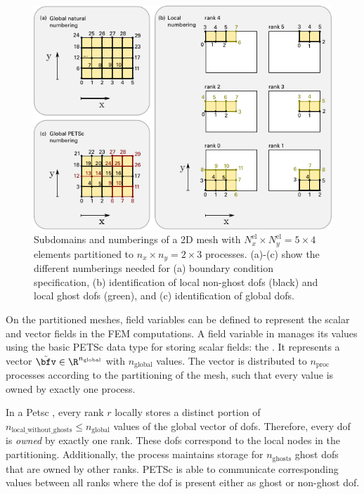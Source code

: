 \begin{figure}%
  \centering%
  \includegraphics[width=\textwidth]{images/implementation/dof_numbering.pdf}%
  \caption{Subdomains and numberings of a 2D mesh with $N^\text{el}_x \times N^\text{el}_y=5\times 4$ elements partitioned to $n_x\times n_y = 2 \times 3$ processes. (a)-(c) show the different numberings needed for (a) boundary condition specification, (b) identification of local non-ghost dofs (black) and local ghost dofs (green), and (c) identification of global dofs.}%
  \label{fig:dof_numbering}%
\end{figure}%

\renewcommand{\Vec}{\code{Vec}}

On the partitioned meshes, field variables can be defined to represent the scalar and vector fields in the FEM computations. A field variable in \opendihu{} manages its values using the basic PETSc data type for storing scalar fields: the \emph{\Vec{}}. It represents a vector $\tilde{\bfv} \in \R^{n_\text{global}}$ with $n_\text{global}$ values. The vector is distributed to $n_\text{proc}$ processes according to the partitioning of the mesh, such that every value is owned by exactly one process. 

In a Petsc \Vec{}, every rank $r$ locally stores a distinct portion of $n_\text{local\_without\_ghosts} \leq n_\text{global}$ values of the global vector of dofs. Therefore, every dof is \emph{owned} by exactly one rank. These dofs correspond to the local nodes in the partitioning.
Additionally, the process maintains storage for $n_\text{ghosts}$ ghost dofs that are owned by other ranks. 
PETSc is able to communicate corresponding values between all ranks where the dof is present either as ghost or non-ghost dof. 

